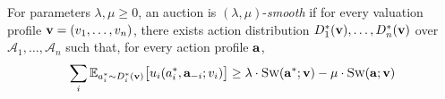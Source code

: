 \begin{theorem}	\label{def:smooth-auctions}
For parameters $\lambda, \mu \geq 0$, an auction is $(\lambda,\mu)$-\emph{smooth} if for every valuation profile
$\mathbf{v} = (v_{1}, \ldots, v_{n})$,
there exists action distribution $D^{*}_{1}(\mathbf{v}), \ldots,D^{*}_{n}(\mathbf{v})$ over $\mathcal{A}_{1}, \ldots, \mathcal{A}_{n}$
such that, for every action profile $\mathbf{a}$,
%
\begin{align}	\label{eq:smooth-auctions}
\sum_{i} \mathbb{E}_{a^{*}_{i} \sim D^{*}_{i}(\mathbf{v})} \bigl[ u_{i}(a^{*}_{i},\mathbf{a}_{-i}; v_{i}) \bigr]
	\geq \lambda \cdot \textsc{Sw}(\mathbf{a}^{*};\mathbf{v}) - \mu \cdot \textsc{Sw}(\mathbf{a};\mathbf{v})
\end{align}
\end{theorem}
